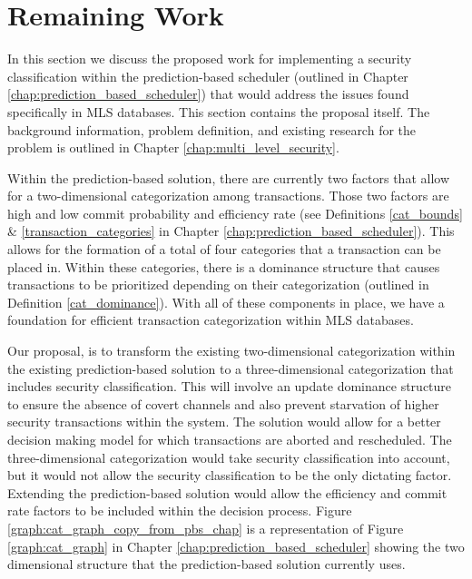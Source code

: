 \section{Remaining Work}
\label{mls:remaining_work}

In this section we discuss the proposed work for implementing a security classification within the prediction-based scheduler (outlined in Chapter \ref{chap:prediction_based_scheduler}) that would address the issues found specifically in MLS databases. This section contains the proposal itself. The background information, problem definition, and existing research for the problem is outlined in Chapter \ref{chap:multi_level_security}.

Within the prediction-based solution, there are currently two factors that allow for a two-dimensional categorization among transactions. Those two factors are high and low commit probability and efficiency rate (see Definitions \ref{cat_bounds} \& \ref{transaction_categories} in Chapter \ref{chap:prediction_based_scheduler}). This allows for the formation of a total of four categories that a transaction can be placed in. Within these categories, there is a dominance structure that causes transactions to be prioritized depending on their categorization (outlined in Definition \ref{cat_dominance}). With all of these components in place, we have a foundation for efficient transaction categorization within MLS databases.

Our proposal, is to transform the existing two-dimensional categorization within the existing prediction-based solution to a three-dimensional categorization that includes security classification. This will involve an update dominance structure to ensure the absence of covert channels and also prevent starvation of higher security transactions within the system. The solution would allow for a better decision making model for which transactions are aborted and rescheduled. The three-dimensional categorization would take security classification into account, but it would not allow the security classification to be the only dictating factor. Extending the prediction-based solution would allow the efficiency and commit rate factors to be included within the decision process. Figure \ref{graph:cat_graph_copy_from_pbs_chap} is a representation of Figure \ref{graph:cat_graph} in Chapter \ref{chap:prediction_based_scheduler} showing the two dimensional structure that the prediction-based solution currently uses.


